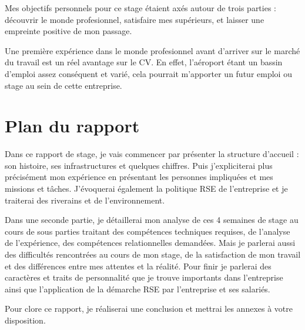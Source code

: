 Mes objectifs personnels pour ce stage étaient axés autour de trois parties : découvrir le monde profesionnel, satisfaire mes supérieurs, et laisser une empreinte positive de mon passage.


Une première expérience dans le monde profesionnel avant d’arriver sur le marché du travail est un réel avantage sur le CV. En effet, l’aéroport étant un bassin d’emploi assez conséquent et varié, cela pourrait m’apporter un futur emploi ou stage au sein de cette entreprise.



\section{Plan du rapport}

Dans ce rapport de stage, je vais commencer par présenter la structure d'accueil : son histoire, ses infrastructures et quelques chiffres. Puis j'expliciterai plus précisément mon expérience en présentant les personnes impliquées et mes missions et tâches. J'évoquerai également la politique RSE de l'entreprise et je traiterai des riverains et de l'environnement.

Dans une seconde partie, je détaillerai mon analyse de ces 4 semaines de stage au cours de sous parties traitant des compétences techniques requises, de l'analyse de l'expérience, des compétences relationnelles demandées. Mais je parlerai aussi des difficultés rencontrées au cours de mon stage, de la satisfaction de mon travail et des différences entre mes attentes et la réalité. Pour finir je parlerai des caractères et traits de personnalité que je trouve importants dans l'entreprise ainsi que l'application de la démarche RSE par l'entreprise et ses salariés.

Pour clore ce rapport, je réaliserai une conclusion et mettrai les annexes à votre disposition.